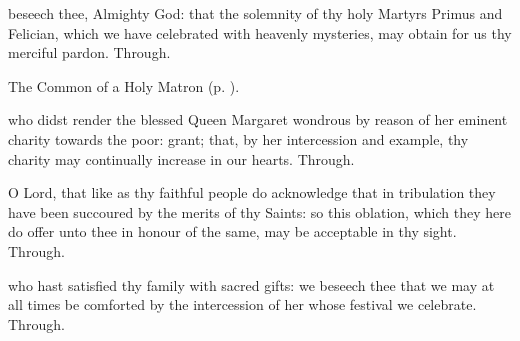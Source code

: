 \postcommunion

\vspace{-0.1\baselineskip}

 beseech thee, Almighty God: that the solemnity of thy holy Martyrs Primus and Felician, which we have celebrated with heavenly mysteries, may obtain for us thy merciful pardon. Through.



\begin{rubric}
	The Common of a Holy Matron (p. \pageref{CommonNeitherVirginMartyr}).
\end{rubric}

\vspace{-0.25\baselineskip}

\collect

\vspace{-0.1\baselineskip}

 who didst render the blessed Queen Margaret wondrous by reason of her eminent charity towards the poor: grant; that, by her intercession and example, thy charity may continually increase in our hearts. Through.

\vspace{-0.25\baselineskip}

\secret

\vspace{-0.1\baselineskip}

 O Lord, that like as thy faithful people do acknowledge that in tribulation they have been succoured by the merits of thy Saints: so this oblation, which they here do offer unto thee in honour of the same, may be acceptable in thy sight. Through.

\vspace{-0.25\baselineskip}

\postcommunion

\vspace{-0.1\baselineskip}

 who hast satisfied thy family with sacred gifts: we beseech thee that we may at all times be comforted by the intercession of her whose festival we celebrate. Through.


\clearpage
{}

